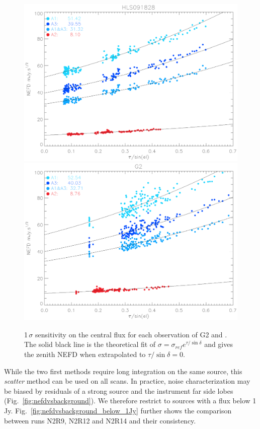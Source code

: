 \begin{figure}[hhh]
\begin{center}
\includegraphics[clip, angle=0, scale =0.42]{Figures/hls_NEFD_vs_TauElev_all.eps}
\includegraphics[clip, angle=0, scale =0.42]{Figures/g2_NEFD_vs_TauElev_all.eps}
\caption[NEFD per scan]{1\,$\sigma$ sensitivity on the central flux for each
  observation of G2 and \hls. The solid black line is the theoretical fit of
  $\sigma = \sigma_{ref}e^{\tau/\sin\delta}$ and gives the zenith NEFD when
  extrapolated to $\tau/\sin\delta = 0$.}
\label{fig:nefd_scatter}
\end{center}
\end{figure}

While the two first methods require long integration on the same source, this
\emph{scatter} method can be used on all scans. In practice, noise
characterization may be biased by residuals of a strong source and the
instrument far side lobes (Fig.~\ref{fig:nefdvsbackground}). We therefore
restrict to sources with a flux below
1\,Jy. Fig.~\ref{fig:nefdvsbackground_below_1Jy} further shows the comparison
between runs N2R9, N2R12 and N2R14 and their consistency.

